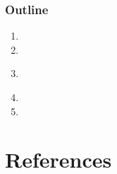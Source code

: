 \documentclass[usenames,dvipsnames]{beamer}
\begin{document}
% 

\miniframesoff
  \begin{frame}
    \frametitle{\textbf{ Outline}}
  \begin{enumerate}
    \item \introtitle
    \item \firsttitle
    \item \textbf{\secondtitle}
    \item \thirdtitle
    \item \conclusiontitle
  \end{enumerate}
  \end{frame}
\miniframeson




% 
  

\hypertarget{references}{%
\section{References}\label{references}}
\end{document}
